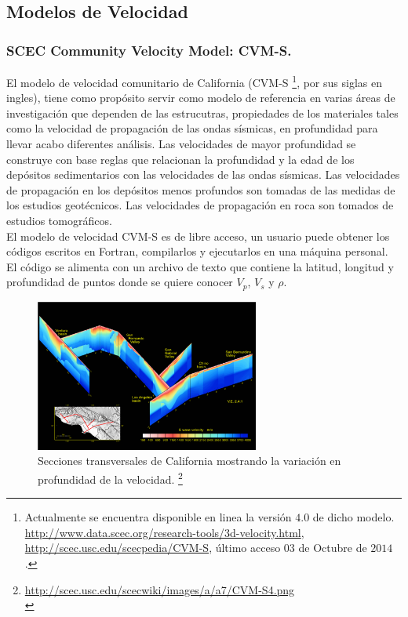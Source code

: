 \documentclass{beamer}
\begin{document}
\subsection{Modelos de Velocidad}
\begin{frame}[allowframebreaks]
\frametitle{SCEC Community Velocity Model: CVM-S.}
%
\justifying
%
El modelo de velocidad comunitario de California (CVM-S \footnote{Actualmente se encuentra disponible en linea la versión $4.0$ de dicho modelo. \url{http://www.data.scec.org/research-tools/3d-velocity.html}, \url{http://scec.usc.edu/scecpedia/CVM-S}, último acceso $03$ de Octubre de $2014$.}, por sus siglas en ingles), tiene como propósito servir como modelo de referencia en varias áreas de investigación que dependen de las estrucutras, propiedades de los materiales tales como la velocidad de propagación de las ondas sísmicas, en profundidad para llevar acabo diferentes análisis. Las velocidades de mayor profundidad se construye con base reglas que relacionan la profundidad y la edad de los depósitos sedimentarios con las velocidades de las ondas sísmicas. Las velocidades de propagación en los depósitos menos profundos son tomadas de las medidas de los estudios geotécnicos. Las velocidades de propagación en roca son tomados de estudios tomográficos.\\
%
El modelo de velocidad CVM-S es de libre acceso, un usuario puede obtener los códigos escritos en Fortran, compilarlos y ejecutarlos en una máquina personal. El código se alimenta con un archivo de texto que contiene la latitud, longitud y profundidad de puntos donde se quiere conocer $V_p$, $V_s$ y $\rho$.
%
%
\begin{figure}[h]
	\centering
	\includegraphics[height=5cm]{img/CVM-S4.pdf}
	\caption{Secciones transversales de California mostrando la variación en profundidad de la velocidad. \footnote{\tiny \url{http://scec.usc.edu/scecwiki/images/a/a7/CVM-S4.png}\\}}
\end{figure}
%
\end{frame}
\end{document}
